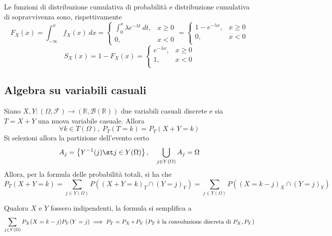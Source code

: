                 Le funzioni di distribuzione cumulativa di probabilità e distribuzione cumulativa di sopravvivenza sono, rispettivamente
                \[
                    F_{X}(x) = \int_{-\infty}^{x} f_{X}(x) \: dx =
                    \begin{cases}
                        \int_{0}^{x} \lambda e^{-\lambda t} \: dt, &x \geq 0 \\
                        0, &x < 0
                    \end{cases} =
                    \begin{cases}
                        1 - e^{- \lambda x}, &x \geq 0 \\
                        0, &x < 0 \\
                    \end{cases}
                \]
                \[
                    S_{X}(x) = 1 - F_{X}(x) =
                    \begin{cases}
                        e^{- \lambda x}, &x \geq 0 \\
                        1, &x < 0 \\
                    \end{cases}
                \]

        \subsection{Algebra su variabili casuali}
            Siano $X, Y: (\Omega, \mathcal{F}) \rightarrow (\mathbb{R}, \mathcal{B}(\mathbb{R}))$ due variabili casuali discrete e sia $T = X + Y$ una nuova variabile casuale.
            Allora
            \[
                \forall k \in T(\Omega), \; P_{T}(T = k) = P_{T}(X + Y = k)
            \]
            Si selezioni allora la partizione dell'evento certo
            \[
                A_{j} = \left\{ Y^{-1}(j) \st j \in Y(\Omega) \right\}, \quad \bigcup_{j \in Y(\Omega)} A_{j} = \Omega
            \]
            Allora, per la formula delle probabilità totali, si ha che
            \[
                P_{T}(X + Y = k) = \sum_{j \in Y(\Omega)} P((X + Y = k)_{T} \cap (Y = j)_{Y}) =
                \sum_{j \in Y(\Omega)} P((X = k - j)_{X} \cap (Y = j)_{Y})
            \]

            Qualora $X$ e $Y$ fossero indipendenti, la formula si semplifica a
            \[
                \sum_{j \in Y(\Omega)} P_{X}(X = k - j)P_{Y}(Y = j) \implies P_{T} = P_{X} * P_{Y} \; (P_{T} \textnormal{ è la convoluzione discreta di } P_{X}, P_{Y})
            \]

